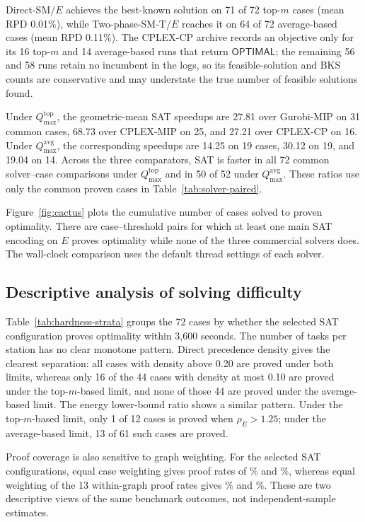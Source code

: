\documentclass[]{interact}
\theoremstyle{plain}
\theoremstyle{definition}
\theoremstyle{remark}
\newcommand{\Status}[1]{\ensuremath{\mathsf{#1}}}
\begin{document}
Direct-SM/$E$ achieves the best-known solution on 71 of 72 top-$m$ cases (mean RPD 0.01\%), while Two-phase-SM-T/$E$ reaches it on 64 of 72 average-based cases (mean RPD 0.11\%). The CPLEX-CP archive records an objective only for its 16 top-$m$ and 14 average-based runs that return \Status{OPTIMAL}; the remaining 56 and 58 runs retain no incumbent in the logs, so its feasible-solution and BKS counts are conservative and may understate the true number of feasible solutions found.

Under $Q_{\max}^{\mathrm{top}}$, the geometric-mean SAT speedups are 27.81 over Gurobi-MIP on 31 common cases, 68.73 over CPLEX-MIP on 25, and 27.21 over CPLEX-CP on 16. Under $Q_{\max}^{\mathrm{avg}}$, the corresponding speedups are 14.25 on 19 cases, 30.12 on 19, and 19.04 on 14. Across the three comparators, SAT is faster in all 72 common solver--case comparisons under $Q_{\max}^{\mathrm{top}}$ and in 50 of 52 under $Q_{\max}^{\mathrm{avg}}$. These ratios use only the common proven cases in Table~\ref{tab:solver-paired}.

Figure~\ref{fig:cactus} plots the cumulative number of cases solved to proven optimality. There are \HardCaseCount{} case--threshold pairs for which at least one main SAT encoding on $E$ proves optimality while none of the three commercial solvers does. The wall-clock comparison uses the default thread settings of each solver.



\FloatBarrier
\subsection{Descriptive analysis of solving difficulty}

Table~\ref{tab:hardness-strata} groups the 72 cases by whether the selected SAT configuration proves optimality within 3,600 seconds. The number of tasks per station has no clear monotone pattern. Direct precedence density gives the clearest separation: all cases with density above 0.20 are proved under both limits, whereas only 16 of the 44 cases with density at most 0.10 are proved under the top-$m$-based limit, and none of those 44 are proved under the average-based limit. The energy lower-bound ratio shows a similar pattern. Under the top-$m$-based limit, only 1 of 12 cases is proved when $\rho_E>1.25$; under the average-based limit, 13 of 61 such cases are proved.

Proof coverage is also sensitive to graph weighting. For the selected SAT configurations, equal case weighting gives proof rates of \CaseWeightedTopSATProofPct\% and \CaseWeightedAVGSATProofPct\%, whereas equal weighting of the 13 within-graph proof rates gives \GraphBalancedTopSATProofPct\% and \GraphBalancedAVGSATProofPct\%. These are two descriptive views of the same benchmark outcomes, not independent-sample estimates.
\end{document}
